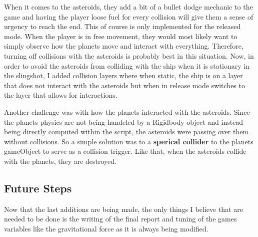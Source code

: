 When it comes to the asteroids, they add a bit of a bullet dodge
mechanic to the game and having the player loose fuel for every
collision will give them a sense of urgency to reach the end. This of
course is only implemented for the released mode. When the player is in
free movement, they would most likely want to simply observe how the
planets move and interact with everything. Therefore, turning off
collisions with the asteroids is probably best in this situation. Now,
in order to avoid the asteroids from colliding with the ship when it is
stationary in the slingshot, I added collision layers where when static,
the ship is on a layer that does not interact with the asteroids but
when in release mode switches to the layer that allows for interactions.

Another challenge was with how the planets interacted with the
asteroids. Since the planets physics are not being handeled by a
Rigidbody object and instead being directly computed within the script,
the asteroids were passing over them without collisions. So a simple
solution was to a \textbf{sperical collider} to the planets gameObject
to serve as a collision trigger. Like that, when the asteroids collide
with the planets, they are destroyed.

\hypertarget{future-steps}{%
\subsection{Future Steps}\label{future-steps}}

Now that the last additions are being made, the only things I believe
that are needed to be done is the writing of the final report and tuning
of the games variables like the gravitational force as it is always
being modified.

